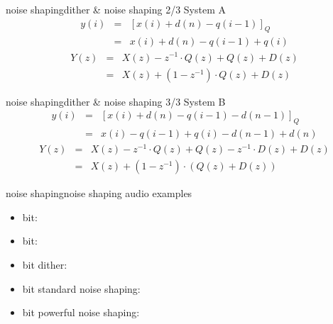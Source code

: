 	\begin{frame}{noise shaping}{dither \& noise shaping 2/3}
		System A
			\begin{eqnarray*}
				y(i) &=& [x(i) + d(n) -q(i-1)]_Q \nonumber\\
				&=& x(i)+d(n)-q(i-1)+q(i)
			\end{eqnarray*}
			\pause
			\begin{eqnarray*}
				Y(z) &=& X(z) - z^{-1}\cdot Q(z) + Q(z) + D(z)\nonumber\\
				&=& X(z) + (1-z^{-1})\cdot Q(z) + D(z)
			\end{eqnarray*}
	\end{frame}
	
	\begin{frame}{noise shaping}{dither \& noise shaping 3/3}
		System B
			\begin{eqnarray*}
				y(i) &=& [x(i) + d(n) - q(i-1) - d(n-1)]_Q \nonumber\\
				&=& x(i)-q(i-1)+q(i)-d(n-1)+d(n)
			\end{eqnarray*}
			\pause
			\begin{eqnarray*}
				Y(z) &=& X(z) - z^{-1}\cdot Q(z) + Q(z) - z^{-1}\cdot D(z) + D(z)\nonumber\\
				&=& X(z) + (1-z^{-1})\cdot (Q(z) + D(z))
			\end{eqnarray*}
	\end{frame}
	
	\begin{frame}{noise shaping}{noise shaping audio examples}
        \begin{itemize}
            \item   \unit[16]{bit}: 
            \item   \unit[8]{bit}: 
            \item   \unit[8]{bit} dither: 
            \item   \unit[8]{bit} standard noise shaping: 
            \item   \unit[8]{bit} powerful noise shaping: 
        \end{itemize}
	\end{frame}
	
